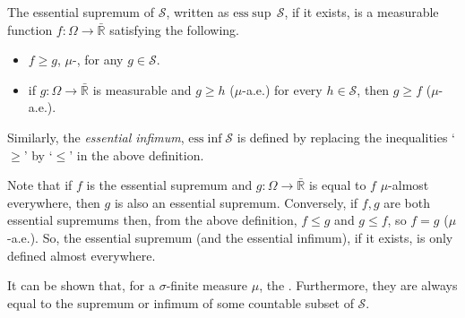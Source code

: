 \documentclass{article}
\newcommand{\esssup}{{\mathrm{ess}\sup}}
\newcommand{\essinf}{{\mathrm{ess}\inf}}
\begin{document}
The essential supremum of $\mathcal{S}$, written as $\esssup\,\mathcal{S}$, if it exists, is a measurable function $f\colon\Omega\rightarrow\mathbb{\bar R}$ satisfying the following.
\begin{itemize}
\item $f\ge g$, $\mu$-, for any $g\in\mathcal{S}$.
\item if $g\colon\Omega\rightarrow\mathbb{\bar R}$ is measurable and $g\ge h$ ($\mu$-a.e.) for every $h\in\mathcal{S}$, then $g\ge f$ ($\mu$-a.e.).
\end{itemize}
Similarly, the \emph{essential infimum}, $\essinf\mathcal{S}$ is defined by replacing the inequalities `$\ge$' by `$\le$' in the above definition.

Note that if $f$ is the essential supremum and $g\colon\Omega\rightarrow\mathbb{\bar R}$ is equal to $f$ $\mu$-almost everywhere, then $g$ is also an essential supremum. Conversely, if $f,g$ are both essential supremums then, from the above definition, $f\le g$ and $g\le f$, so $f=g$ ($\mu$-a.e.). So, the essential supremum (and the essential infimum), if it exists, is only defined almost everywhere.

It can be shown that, for a $\sigma$-finite measure $\mu$, the . Furthermore, they are always equal to the supremum or infimum of some countable subset of $\mathcal{S}$.
\end{document}
